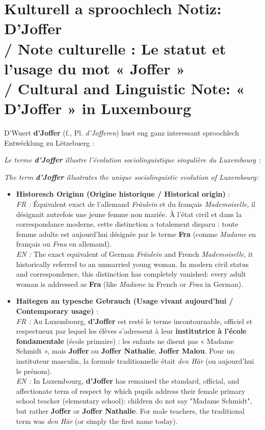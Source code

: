 \section[Kulturell Notiz: D'Joffer / Cultural Note: D'Joffer]{Kulturell a sproochlech Notiz: D'Joffer \\/ Note culturelle : Le statut et l'usage du mot « Joffer » \\/ Cultural and Linguistic Note: « D'Joffer » in Luxembourg}

D'Wuert \textbf{d'Joffer} (f., Pl. \textit{d'Jofferen}) huet eng ganz interessant sproochlech Entwécklung zu Lëtzebuerg :

\textit{Le terme \textbf{d'Joffer} illustre l'évolution sociolinguistique singulière du Luxembourg :}

\textit{The term \textbf{d'Joffer} illustrates the unique sociolinguistic evolution of Luxembourg:}

\begin{itemize}
    \item \textbf{Historesch Originn (Origine historique / Historical origin)} : \\
    \textit{FR :} Équivalent exact de l'allemand \textit{Fräulein} et du français \textit{Mademoiselle}, il désignait autrefois une jeune femme non mariée. À l'état civil et dans la correspondance moderne, cette distinction a totalement disparu : toute femme adulte est aujourd'hui désignée par le terme \textbf{Fra} (comme \textit{Madame} en français ou \textit{Frau} en allemand). \\
    \textit{EN :} The exact equivalent of German \textit{Fräulein} and French \textit{Mademoiselle}, it historically referred to an unmarried young woman. In modern civil status and correspondence, this distinction has completely vanished: every adult woman is addressed as \textbf{Fra} (like \textit{Madame} in French or \textit{Frau} in German).

    \vspace{0.4em}

    \item \textbf{Haitegen an typesche Gebrauch (Usage vivant aujourd'hui / Contemporary usage)} : \\
    \textit{FR :} Au Luxembourg, \textbf{d'Joffer} est resté le terme incontournable, officiel et respectueux par lequel les élèves s'adressent à leur \textbf{institutrice à l'école fondamentale} (école primaire) : les enfants ne disent pas « Madame Schmidt », mais \textbf{Joffer} ou \textbf{Joffer Nathalie}, \textbf{Joffer Malou}. Pour un instituteur masculin, la formule traditionnelle était \textit{den Här} (ou aujourd'hui le prénom). \\
    \textit{EN :} In Luxembourg, \textbf{d'Joffer} has remained the standard, official, and affectionate term of respect by which pupils address their female primary school teacher (elementary school): children do not say "Madame Schmidt", but rather \textbf{Joffer} or \textbf{Joffer Nathalie}. For male teachers, the traditional term was \textit{den Här} (or simply the first name today).
\end{itemize}

